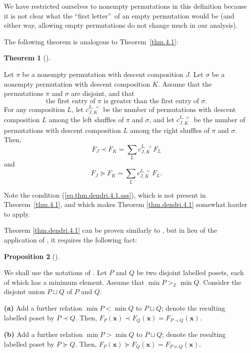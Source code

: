 \documentclass[numbers=enddot,12pt,final,onecolumn,notitlepage]{scrartcl}%
\theoremstyle{definition}
\newtheorem{theo}{Theorem}[section]
\newenvironment{theorem}[1][]
{\begin{theo}[#1]\begin{leftbar}}
{\end{leftbar}\end{theo}}
\newtheorem{prop}[theo]{Proposition}
\newenvironment{proposition}[1][]
{\begin{prop}[#1]\begin{leftbar}}
{\end{leftbar}\end{prop}}
\let\sumnonlimits\sum
\renewcommand{\sum}{\sumnonlimits\limits}
\begin{document}
We have restricted ourselves to nonempty permutations in this definition
because it is not clear what the \textquotedblleft first
letter\textquotedblright\ of an empty permutation would be (and either way,
allowing empty permutations do not change much in our analysis).

The following theorem is analogous to Theorem~\ref{thm.4.1}:

\begin{theorem}
\label{thm.dendri.4.1}Let $\pi$ be a nonempty permutation with descent
composition $J$. Let $\sigma$ be a nonempty permutation with descent
composition $K$. Assume that the permutations $\pi$ and $\sigma$ are disjoint,
and that%
\begin{equation}
\text{the first entry of }\pi\text{ is greater than the first entry of }%
\sigma\text{.} \label{eq.thm.dendri.4.1.ass}%
\end{equation}
For any composition $L$, let $c_{J,K}^{L,\prec}$ be the number of permutations
with descent composition $L$ among the left shuffles of $\pi$ and $\sigma$,
and let $c_{J,K}^{L,\succ}$ be the number of permutations with descent
composition $L$ among the right shuffles of $\pi$ and $\sigma$. Then,%
\[
F_{J}\left.  \prec\right.  F_{K}=\sum_{L}c_{J,K}^{L,\prec}F_{L}%
\]
and%
\[
F_{J}\left.  \succeq\right.  F_{K}=\sum_{L}c_{J,K}^{L,\succ}F_{L}.
\]

\end{theorem}

Note the condition (\ref{eq.thm.dendri.4.1.ass}), which is not present in
Theorem~\ref{thm.4.1}, and which makes Theorem \ref{thm.dendri.4.1} somewhat
harder to apply.

Theorem \ref{thm.dendri.4.1} can be proven similarly to \cite[(5.2.6)]%
{HopfComb}, but in lieu of the application of \cite[Lemma 5.2.17]{HopfComb},
it requires the following fact:

\begin{proposition}
\label{prop.dendri.4.1.lem}We shall use the notations of \cite[Section
5.2]{HopfComb}. Let $P$ and $Q$ be two disjoint labelled posets, each of which
has a minimum element. Assume that $\min P>_{\mathbb{Z}}\min Q$. Consider the
disjoint union $P\sqcup Q$ of $P$ and $Q$.

\textbf{(a)} Add a further relation $\min P<\min Q$ to $P\sqcup Q$; denote the
resulting labelled poset by $P\left.  \prec\right.  Q$. Then, $F_{P}\left(
\mathbf{x}\right)  \left.  \prec\right.  F_{Q}\left(  \mathbf{x}\right)
=F_{P\left.  \prec\right.  Q}\left(  \mathbf{x}\right)  $.

\textbf{(b)} Add a further relation $\min P>\min Q$ to $P\sqcup Q$; denote the
resulting labelled poset by $P\left.  \succeq\right.  Q$. Then, $F_{P}\left(
\mathbf{x}\right)  \left.  \succeq\right.  F_{Q}\left(  \mathbf{x}\right)
=F_{P\left.  \succeq\right.  Q}\left(  \mathbf{x}\right)  $.
\end{proposition}
\end{document}
